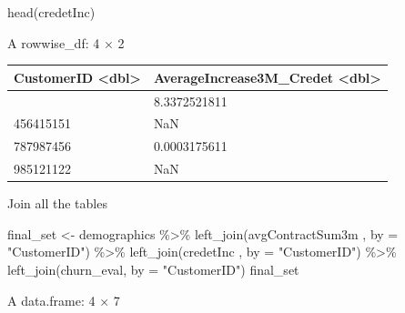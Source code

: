 \documentclass[
  letterpaper,
  DIV=11,
  numbers=noendperiod]{scrreprt}
\newenvironment{Shaded}{\begin{snugshade}}{\end{snugshade}}
\newcommand{\AttributeTok}[1]{\textcolor[rgb]{0.40,0.45,0.13}{#1}}
\newcommand{\FunctionTok}[1]{\textcolor[rgb]{0.28,0.35,0.67}{#1}}
\newcommand{\NormalTok}[1]{\textcolor[rgb]{0.00,0.23,0.31}{#1}}
\newcommand{\OtherTok}[1]{\textcolor[rgb]{0.00,0.23,0.31}{#1}}
\newcommand{\SpecialCharTok}[1]{\textcolor[rgb]{0.37,0.37,0.37}{#1}}
\newcommand{\StringTok}[1]{\textcolor[rgb]{0.13,0.47,0.30}{#1}}
\begin{document}
\begin{Shaded}
\begin{Highlighting}[]
\FunctionTok{head}\NormalTok{(credetInc)}
\end{Highlighting}
\end{Shaded}

A rowwise\_df: 4 × 2

\begin{longtable}[]{@{}ll@{}}
\toprule\noalign{}
CustomerID \textless dbl\textgreater{} & AverageIncrease3M\_Credet
\textless dbl\textgreater{} \\
\midrule\noalign{}
\endhead
\bottomrule\noalign{}
\endlastfoot
215454555 & 8.3372521811 \\
456415151 & NaN \\
787987456 & 0.0003175611 \\
985121122 & NaN \\
\end{longtable}

Join all the tables

\begin{Shaded}
\begin{Highlighting}[]
\NormalTok{final\_set }\OtherTok{\textless{}{-}}\NormalTok{ demographics }\SpecialCharTok{\%\textgreater{}\%} 
        \FunctionTok{left\_join}\NormalTok{(avgContractSum3m , }\AttributeTok{by =} \StringTok{"CustomerID"}\NormalTok{) }\SpecialCharTok{\%\textgreater{}\%}
        \FunctionTok{left\_join}\NormalTok{(credetInc , }\AttributeTok{by =} \StringTok{"CustomerID"}\NormalTok{) }\SpecialCharTok{\%\textgreater{}\%}
        \FunctionTok{left\_join}\NormalTok{(churn\_eval, }\AttributeTok{by =} \StringTok{"CustomerID"}\NormalTok{)}
\NormalTok{final\_set}
\end{Highlighting}
\end{Shaded}

A data.frame: 4 × 7
\end{document}
